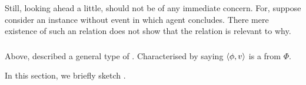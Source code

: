 \begin{note}
  Still, looking ahead a little, \supportII{} should not be of any immediate concern.
  For, suppose consider an instance \ros{} without event in which agent concludes.
  There mere existence of such an relation does not show that the relation is relevant to why.
\end{note}

\subsubsection{}
\label{cha:var:ros:II:fcs}

\begin{note}
  Above, described a general type of .
  Characterised  by saying \(\langle \phi, v \rangle\) is a  from \(\Phi\).

  In this section, we briefly sketch .
\end{note}

